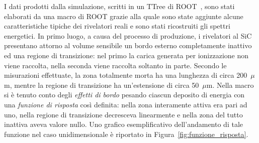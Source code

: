 I dati prodotti dalla simulazione, scritti in un TTree di ROOT~\cite{brun:nima97}, sono stati elaborati da una macro di ROOT grazie alla quale sono state aggiunte alcune caratteristiche tipiche dei rivelatori reali e sono stati ricostruiti gli spettri energetici.
%
In primo luogo, a causa del processo di produzione, i rivelatori al SiC presentano attorno al volume sensibile un bordo esterno completamente inattivo ed una regione di transizione: nel primo la carica generata per ionizzazione non viene raccolta, nella seconda viene raccolta soltanto in parte.
Secondo le misurazioni effettuate, la zona totalmente morta ha una lunghezza di circa 200~$\mu$m, mentre la regione di transizione ha un'estensione di circa 50~$\mu$m. 
%
Nella macro si è tenuto conto degli \emph{effetti di bordo} pesando ciascun deposito di energia con una \emph{funzione di risposta} così definita: nella zona interamente attiva era pari ad uno, nella regione di transizione decresceva linearmente e nella zona del tutto inattiva aveva valore nullo.
Uno grafico esemplificativo dell'andamento di tale funzione nel caso unidimensionale è riportato in Figura~\ref{fig:funzione_risposta}.


